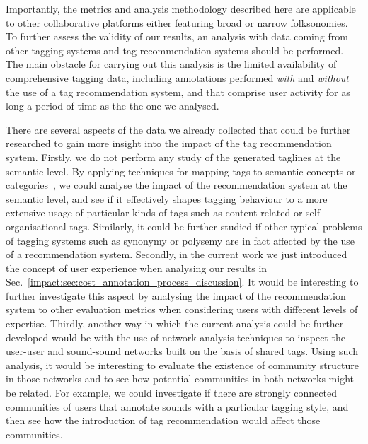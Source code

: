 Importantly, the metrics and analysis methodology described here are applicable to other collaborative platforms either featuring broad or narrow folksonomies. To further assess the validity of our results, an analysis with data coming from other tagging systems and tag recommendation systems should be performed. The main obstacle for carrying out this analysis is the limited availability of comprehensive tagging data, including annotations performed \emph{with} and \emph{without} the use of a tag recommendation system, and that comprise user activity for as long a period of time as the the one we analysed.

There are several aspects of the data we already collected that could be further researched to gain more insight into the impact of the tag recommendation system. 
Firstly, we do not perform any study of the generated taglines at the semantic level. By applying techniques for mapping tags to semantic concepts or categories~\citep[e.g.,][]{cantador2010}, we could analyse the impact of the recommendation system at the semantic level, and see if it effectively shapes tagging behaviour to a more extensive usage of particular kinds of tags such as content-related or self-organisational tags. Similarly, it could be further studied if other typical problems of tagging systems such as synonymy or polysemy are in fact affected by the use of a recommendation system.
Secondly, in the current work we just introduced the concept of user experience when analysing our results in Sec.~\ref{impact:sec:cost_annotation_process_discussion}. It would be interesting to further investigate this aspect by analysing the impact of the recommendation system to other evaluation metrics when considering users with different levels of expertise.
Thirdly, another way in which the current analysis could be further developed would be with the use of network analysis techniques to inspect the user-user and sound-sound networks built on the basis of shared tags. Using such analysis, it would be interesting to evaluate the existence of community structure in those networks and to see how potential communities in both networks might be related. For example, we could investigate if there are strongly connected communities of users that annotate sounds with a particular tagging style, and then see how the introduction of tag recommendation would affect those communities.

